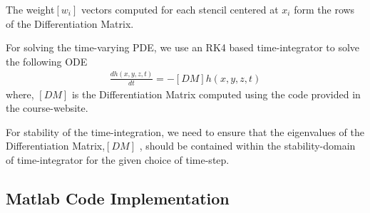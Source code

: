 \documentclass[11pt]{article}
\begin{document}
The weight$[w_i]$ vectors computed for each stencil centered at $x_i$ form the rows of the Differentiation Matrix. 

For solving the time-varying PDE, we use an RK4 based time-integrator to solve the following ODE
\begin{align}
\frac{d h(x,y,z,t)}{dt}  = -[DM] h(x,y,z,t)
\end{align}
where, $[DM]$ is the Differentiation Matrix computed using the code provided in the course-website.

For stability of the time-integration, we need to ensure that the eigenvalues of the Differentiation Matrix,$[DM]$ , should be contained within the stability-domain of time-integrator for the given choice of time-step. 

\subsection{Matlab Code Implementation}
\end{document}
